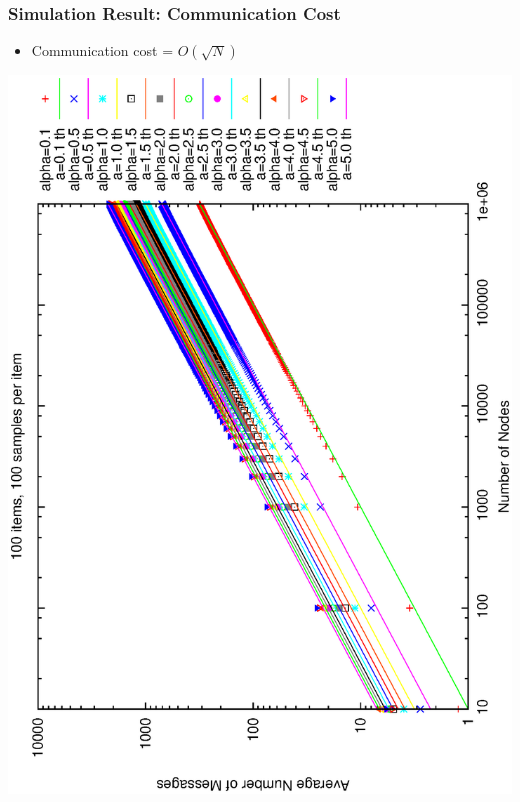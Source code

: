 \documentclass[red]{beamer}
\begin{document}
\begin{frame}
\frametitle{Simulation Result: Communication Cost}
\begin{itemize}
\item Communication cost = $O(\sqrt{N})$
\end{itemize}
\center
\includegraphics[angle=270,scale=0.29]{figs/th_hops_loglog.eps}

\end{frame}
\end{document}
